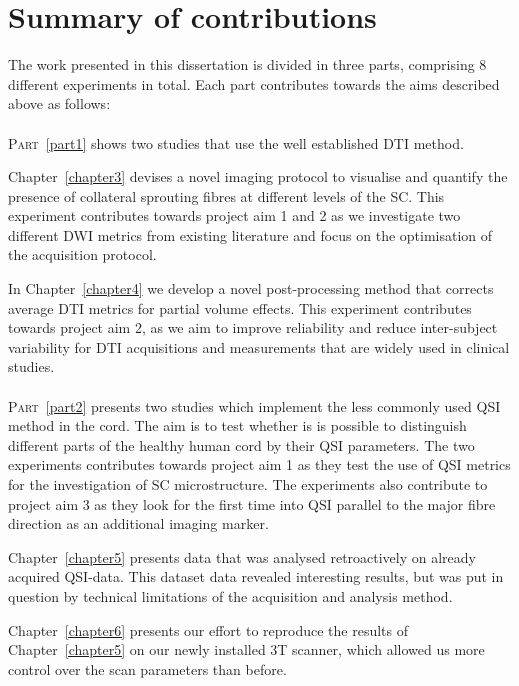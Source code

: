 \section{Summary of contributions}
The work presented in this dissertation is divided in three parts, comprising 8 different experiments in total. Each part contributes towards the aims described above as follows: 

\paragraph{}{\scshape{Part}}~{\protect\ref{part1}} shows two studies that use the well established \gls{DTI} method. 


Chapter~\ref{chapter3} devises a novel imaging protocol to visualise and quantify the presence of collateral sprouting fibres at different levels of the \gls{SC}. This experiment contributes towards project aim 1 and 2 as we investigate two different \gls{DWI} metrics from existing literature and focus on the optimisation of the acquisition protocol.

In Chapter~\ref{chapter4} we develop a novel post-processing method that corrects average \gls{DTI} metrics for partial volume effects. This experiment contributes towards project aim 2, as we aim to improve reliability and reduce inter-subject variability for \gls{DTI} acquisitions and measurements that are widely used in clinical studies. 

\paragraph{}{\scshape{Part}}~{\protect\ref{part2}} presents two studies which implement the less commonly used \gls{QSI} method in the cord. The aim is to test whether is is possible to distinguish different parts of the healthy human cord by their \gls{QSI} parameters. The two  experiments contributes towards project aim 1 as they test the use of \gls{QSI} metrics for the investigation of \gls{SC} microstructure. The experiments also contribute to project aim 3 as they look for the first time into \gls{QSI} parallel to the major fibre direction as an additional imaging marker.

Chapter~\ref{chapter5} presents data that was analysed retroactively on already acquired QSI-data. This dataset data revealed interesting results, but was put in question by technical limitations of the acquisition and analysis method. 

Chapter~\ref{chapter6} presents our effort to reproduce the results of Chapter~\ref{chapter5} on our newly installed 3T scanner, which allowed us more control over the scan parameters than before. 

